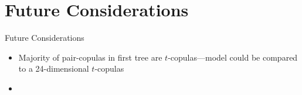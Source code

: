 \section{Future Considerations}
\label{sec:future}

\begin{frame}{Future Considerations}{}
  \begin{itemize}
  \item<2-> Majority of pair-copulas in first tree are \(t\)-copulas---model could be compared to a 24-dimensional \(t\)-copulas
  \item<3->
  \end{itemize}
\end{frame}

